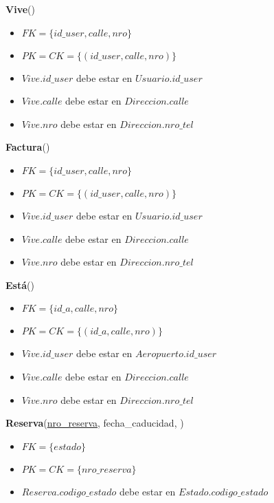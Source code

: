 \vspace*{0.1cm}
\noindent
\textbf{Vive}(\underline{})
\begin{itemize}[noitemsep]
    \item $FK = \{id\_user, calle, nro\}$
    \item $PK = CK = \{(id\_user, calle, nro)\}$
    \item $Vive.id\_user$ debe estar en $Usuario.id\_user$
    \item $Vive.calle$ debe estar en $Direccion.calle$
    \item $Vive.nro$ debe estar en $Direccion.nro\_tel$
\end{itemize}

\vspace*{0.1cm}
\noindent
\textbf{Factura}(\underline{})
\begin{itemize}[noitemsep]
    \item $FK = \{id\_user, calle, nro\}$
    \item $PK = CK = \{(id\_user, calle, nro)\}$
    \item $Vive.id\_user$ debe estar en $Usuario.id\_user$
    \item $Vive.calle$ debe estar en $Direccion.calle$
    \item $Vive.nro$ debe estar en $Direccion.nro\_tel$
\end{itemize}

\vspace*{0.1cm}
\noindent
\textbf{Está}(\underline{})
\begin{itemize}[noitemsep]
    \item $FK = \{id\_a, calle, nro\}$
    \item $PK = CK = \{(id\_a, calle, nro)\}$
    \item $Vive.id\_user$ debe estar en $Aeropuerto.id\_user$
    \item $Vive.calle$ debe estar en $Direccion.calle$
    \item $Vive.nro$ debe estar en $Direccion.nro\_tel$
\end{itemize}


\vspace*{0.1cm}
\noindent
\textbf{Reserva}(\underline{nro\_reserva}, fecha\_caducidad, 
    )
\begin{itemize}[noitemsep]
	\item $FK = \{estado\}$
	\item $PK = CK = \{nro\_reserva\}$
	\item $Reserva.codigo\_estado$ debe estar en $Estado.codigo\_estado$
\end{itemize}


